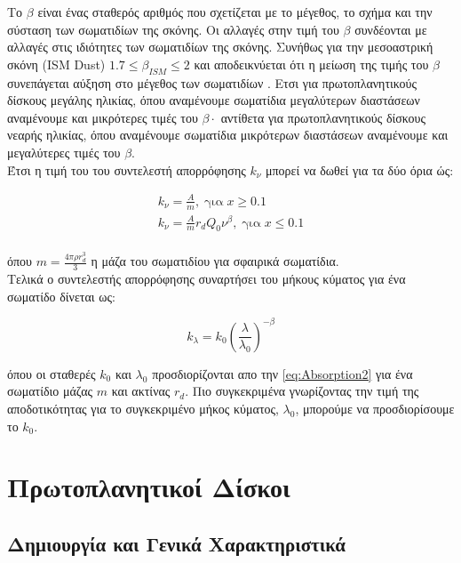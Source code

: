 Το $\beta$ είναι ένας σταθερός αριθμός που σχετίζεται με το μέγεθος, το σχήμα και την σύσταση των σωματιδίων της σκόνης. Οι αλλαγές στην τιμή του $\beta$ συνδέονται με αλλαγές στις ιδιότητες των σωματιδίων της σκόνης. Συνήθως για την μεσοαστρική σκόνη ({\en ISM Dust}) $1.7 \leq \beta_{ISM} \leq 2$ και αποδεικνύεται ότι η μείωση της τιμής του $\beta$ συνεπάγεται αύξηση στο μέγεθος των σωματιδίων \cite{draine2006submillimeter}. Ετσι για πρωτοπλανητικούς δίσκους μεγάλης ηλικίας, όπου αναμένουμε σωματίδια μεγαλύτερων διαστάσεων αναμένουμε και μικρότερες τιμές του $\beta\cdot$ αντίθετα για πρωτοπλανητικούς δίσκους νεαρής ηλικίας, όπου αναμένουμε σωματίδια μικρότερων διαστάσεων αναμένουμε και μεγαλύτερες τιμές του $\beta$.\\

Έτσι η τιμή του του συντελεστή απορρόφησης $k_{\nu}$ μπορεί να δωθεί για τα δύο όρια ώς:

\begin{align}
k_{\nu} = \frac{Α}{m},\; \text{για} \; x \geq 0.1 \nonumber\\
k_{\nu} = \frac{Α}{m} r_{d}Q_{0}{\nu}^{\beta},\; \text{για} \; x \leq 0.1 \label{eq:Absorption3a}  \\  
\end{align}

όπου $m=\frac{4 \pi \rho r_d^3 }{3}$ η μάζα του σωματιδίου για σφαιρικά σωματίδια.\\

Τελικά ο συντελεστής απορρόφησης συναρτήσει του μήκους κύματος για ένα σωματίδο δίνεται ως:

\begin{equation}\label{eq:Absorption4}
 k_{\lambda} = k_{0} (\frac{{\lambda}}{\lambda_{0}})^{-\beta}
\end{equation}

όπου οι σταθερές $k_0$ και $\lambda_{0}$ προσδιορίζονται απο την \eqref{eq:Absorption2} για ένα σωματίδιο μάζας $m$ και ακτίνας $r_d$. Πιο συγκεκριμένα γνωρίζοντας την τιμή της αποδοτικότητας για το συγκεκριμένο μήκος κύματος, $\lambda_{0}$, μπορούμε να προσδιορίσουμε το $k_0$.

\newpage
\section{Πρωτοπλανητικοί Δίσκοι}

  \subsection{Δημιουργία και Γενικά Χαρακτηριστικά}  
  
